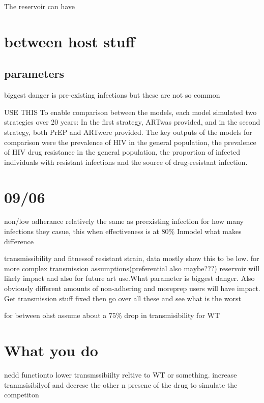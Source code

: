 \documentclass[DIV=15]{scrartcl}
\begin{document}
The reservoir can have 


\section{between host stuff}
   \subsection{parameters}
biggest danger is pre-existing infections but these are not so common


  
USE THIS
To enable comparison between the models, each model
simulated two strategies over 20 years: In the first strategy,
ARTwas provided, and in the second strategy, both PrEP
and ARTwere provided. The key outputs of the models
for comparison were the prevalence of HIV in the general
population, the prevalence of HIV drug resistance in
the general population, the proportion of infected
individuals with resistant infections and the source of
drug-resistant infection.


\section{09/06}
non/low adherance relatively the same as preexisting infection for how many infections they casue, this when effectiveness is at $ 80\%$
Inmodel what makes difference 

transmissibility and fitnessof resistant strain, data mostly show this to be low.  for more complex transmission assumptions(preferential also maybe???) reservoir will likely impact and also for future art use.What parameter is biggest danger. Also obviously different amounts of non-adhering and moreprep users will have impact. Get transmission stuff fixed then go over all these and see what is the worst

 
 
 for between ohst assume about a $75\% $ drop in transmisibility for WT~\cite{partners2012}
 
 
 
 
 \section{What you do}
 
nedd functionto lower transmssibiilty reltive to WT or  something. increase tranmsisibilyof and decrese the other n presenc of  the drug to  simulate the competiton 
\end{document}
